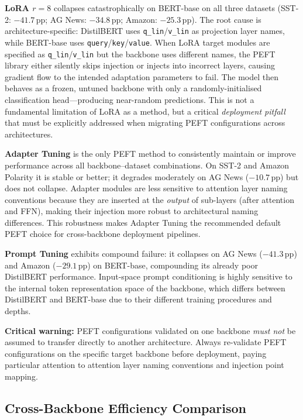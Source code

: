 \documentclass[conference]{IEEEtran}
\begin{document}
\textbf{LoRA $r{=}8$} collapses catastrophically on BERT-base on all three datasets (SST-2: $-41.7$\,pp; AG News: $-34.8$\,pp; Amazon: $-25.3$\,pp). The root cause is architecture-specific: DistilBERT uses \texttt{q\_lin}/\texttt{v\_lin} as projection layer names, while BERT-base uses \texttt{query}/\texttt{key}/\texttt{value}. When LoRA target modules are specified as \texttt{q\_lin}/\texttt{v\_lin} but the backbone uses different names, the PEFT library either silently skips injection or injects into incorrect layers, causing gradient flow to the intended adaptation parameters to fail. The model then behaves as a frozen, untuned backbone with only a randomly-initialised classification head---producing near-random predictions. This is not a fundamental limitation of LoRA as a method, but a critical \emph{deployment pitfall} that must be explicitly addressed when migrating PEFT configurations across architectures.

\textbf{Adapter Tuning} is the only PEFT method to consistently maintain or improve performance across all backbone--dataset combinations. On SST-2 and Amazon Polarity it is stable or better; it degrades moderately on AG News ($-10.7$\,pp) but does not collapse. Adapter modules are less sensitive to attention layer naming conventions because they are inserted at the \emph{output} of sub-layers (after attention and FFN), making their injection more robust to architectural naming differences. This robustness makes Adapter Tuning the recommended default PEFT choice for cross-backbone deployment pipelines.

\textbf{Prompt Tuning} exhibits compound failure: it collapses on AG News ($-41.3$\,pp) and Amazon ($-29.1$\,pp) on BERT-base, compounding its already poor DistilBERT performance. Input-space prompt conditioning is highly sensitive to the internal token representation space of the backbone, which differs between DistilBERT and BERT-base due to their different training procedures and depths.

\textbf{Critical warning:} PEFT configurations validated on one backbone \emph{must not} be assumed to transfer directly to another architecture. Always re-validate PEFT configurations on the specific target backbone before deployment, paying particular attention to attention layer naming conventions and injection point mapping.

\subsection{Cross-Backbone Efficiency Comparison}
\end{document}

